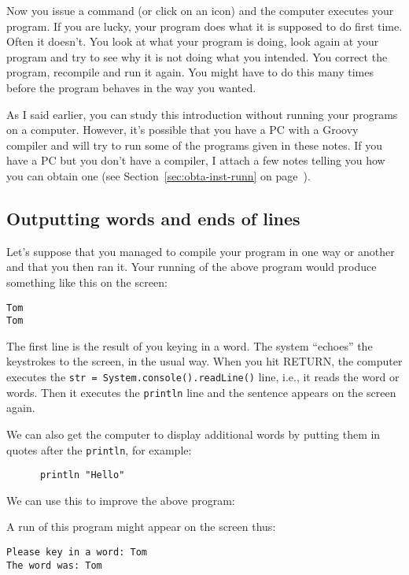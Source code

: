 Now you issue a command (or click on an icon) and the computer executes
your program.  If you are lucky, your program does what it is supposed
to do first time.  Often it doesn't.  You look at what your program is
doing, look again at your program and try to see why it is not doing what
you intended.  You correct the program, recompile and run it again.
You might have to do this many times before the program behaves in the way
you wanted.

As I said earlier, you can study this introduction without running your
programs on a computer.  However, it's possible that you have a PC with
a Groovy compiler and will try to run some of the programs given in these
notes. 
If you have a PC but you don't have a compiler, I attach a few notes telling
you how you can obtain one (see Section~\ref{sec:obta-inst-runn} on
page~\pageref{sec:obta-inst-runn}).

\subsection{Outputting words and ends of lines}

Let's suppose that you managed to compile your program in one way or
another and that you then ran it.  Your running of the above program
would produce something like this on the screen:

\begin{Verbatim}
Tom
Tom
\end{Verbatim}

The first line is the result of you keying in a word.  The system ``echoes''
the keystrokes to the screen, in the usual way.  When you hit RETURN, the
computer executes the \verb!str = System.console().readLine()! line, 
i.e., it reads the word or words.  Then it
executes the \verb!println! line and the sentence appears on the screen again.

We can also get the computer to display additional words by putting
them in quotes after the \verb!println!, for example:

\begin{Verbatim}
      println "Hello"
\end{Verbatim}

We can use this to improve the above program:


A run of this program might appear on the screen thus:
\begin{Verbatim}
Please key in a word: Tom
The word was: Tom
\end{Verbatim}

